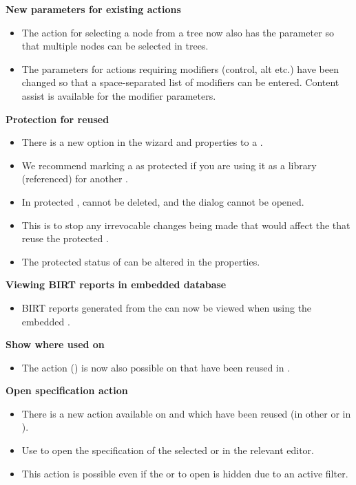 \textbf{New parameters for existing actions}
\begin{itemize}
\item The action for selecting a node from a tree now also has the parameter  so that multiple nodes can be selected in trees.
\item The parameters for actions requiring modifiers (control, alt etc.) have been changed so that a space-separated list of modifiers can be entered. Content assist is available for the modifier parameters.
\end{itemize}

\textbf{Protection for reused \gdprojects{}}
\begin{itemize}
\item There is a new option in the \gdproject{} wizard and \gdproject{} properties to  a \gdproject{}. 
\item We recommend marking a \gdproject{} as protected if you are using it as a library (referenced) \gdproject{} for another \gdproject{}.
\item In protected \gdprojects{}, \gdcases{} cannot be deleted, and the  dialog cannot be opened. 
\item This is to stop any irrevocable changes being made that would affect the \gdprojects{} that reuse the protected \gdproject{}.
\item The protected status of \gdprojects{} can be altered in the \gdproject{} properties.
\end{itemize}
\textbf{Viewing BIRT reports in embedded database}
\begin{itemize}
\item BIRT reports generated from the \gdtestsummaryview{} can now be viewed when using the  embedded \gddb{}.
\end{itemize}
\textbf{Show where used on \gdsuite{}}
\begin{itemize}
\item The action  () is now also possible on \gdsuites{} that have been reused in \gdjobs{}.
\end{itemize}
\textbf{Open specification action}
\begin{itemize}
\item There is a new action available on \gdcases{} and \gdsuites{} which have been reused (in other \gdcases{} or in \gdjobs{}). 
\item Use  to open the specification of the selected \gdcase{} or \gdsuite{} in the relevant editor.
\item This action is possible even if the \gdcase{} or \gdsuite{} to open is hidden due to an active filter. 
\end{itemize}
